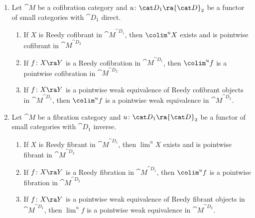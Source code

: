 \begin{thm}
\label{thm::colimfromdirectcat}
\mbox{}
\begin{enumerate}
\item
Let ${\cat M}$ be a cofibration category and $u \colon {\cat D}_1 \ra {\cat D}_2$ be a functor of small categories with ${\cat D}_1$ direct.
\begin{enumerate}
\item
If $X$ is Reedy cofibrant in ${\cat M}^{{\cat D}_1}$, then $\colim^u X$ exists and is pointwise cofibrant in ${\cat M}^{{\cat D}_2}$
\item
If $f \colon X \ra Y$ is a Reedy cofibration in ${\cat M}^{{\cat D}_1}$, then $\colim^u f$ is a pointwise cofibration in ${\cat M}^{{\cat D}_2}$
\item
If $f \colon X \ra Y$ is a pointwise weak equivalence of Reedy cofibrant objects in ${\cat M}^{{\cat D}_1}$, then $\colim^u f$ is a pointwise weak equivalence in ${\cat M}^{{\cat D}_2}$.
\end{enumerate}
\item
Let ${\cat M}$ be a fibration category and $u \colon {\cat D}_1 \ra {\cat D}_2$ be a functor of small categories  with ${\cat D}_1$ inverse.
\begin{enumerate}
\item
If $X$ is Reedy fibrant in ${\cat M}^{{\cat D}_1}$, then $\lim^u X$ exists and is pointwise fibrant in ${\cat M}^{{\cat D}_2}$
\item
If $f \colon X \ra Y$ is a Reedy fibration in ${\cat M}^{{\cat D}_1}$, then $\colim^u f$ is a pointwise fibration in ${\cat M}^{{\cat D}_2}$
\item
If $f \colon X \ra Y$ is a pointwise weak equivalence of Reedy fibrant objects in ${\cat M}^{{\cat D}_1}$, then $\lim^u f$ is a pointwise weak equivalence in ${\cat M}^{{\cat D}_2}$.
\end{enumerate}
\end{enumerate}
\end{thm}

